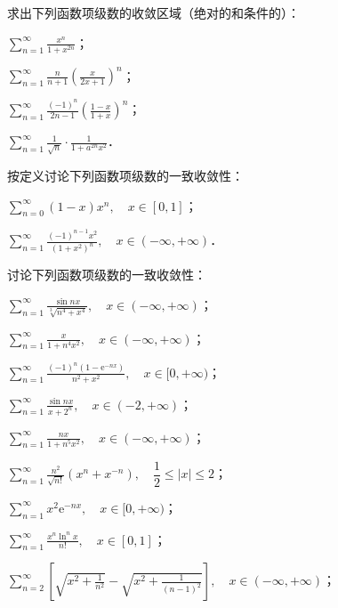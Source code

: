 \begin{xiti}
\item 求出下列函数项级数的收敛区域（绝对的和条件的）：
\begin{ziti}
\item $\displaystyle\sum_{n=1}^{\infty}\frac{x^{n}}{1+x^{2n}}$；
\item $\displaystyle\sum_{n=1}^{\infty}\frac{n}{n+1}\left(\frac{x}{2x+1}\right)^{n}$；
\item $\displaystyle\sum_{n=1}^{\infty}\frac{(-1)^{n}}{2n-1}\left(\frac{1-x}{1+x}\right)^{n}$；
\item $\displaystyle\sum_{n=1}^{\infty}\frac{1}{\sqrt{n}}\cdot\frac{1}{1+a^{2n}x^{2}}$．
\end{ziti}
\item 按定义讨论下列函数项级数的一致收敛性：
\begin{ziti}
\item $\displaystyle\sum_{n=0}^{\infty}(1-x)x^{n},\quad x\in[0,1]$；
\item $\displaystyle\sum_{n=1}^{\infty}\frac{(-1)^{n-1}x^{2}}{\left(1+x^{2}\right)^{n}},\quad x\in(-\infty,+\infty)$．
\end{ziti}
\item 讨论下列函数项级数的一致收敛性：
\begin{ziti}
\item $\displaystyle\sum_{n=1}^{\infty}\frac{\sin nx}{\sqrt[3]{n^{4}+x^{4}}},\quad x\in(-\infty,+\infty)$；
\item $\displaystyle\sum_{n=1}^{\infty}\frac{x}{1+n^{4}x^{2}},\quad x\in(-\infty,+\infty)$；
\item $\displaystyle\sum_{n=1}^{\infty}\frac{(-1)^{n}(1-\mathrm{e}^{-nx})}{n^{2}+x^{2}},\quad x\in[0,+\infty)$；
\item $\displaystyle\sum_{n=1}^{\infty}\frac{\sin nx}{x+2^{n}},\quad x\in(-2,+\infty)$；
\item $\displaystyle\sum_{n=1}^{\infty}\frac{nx}{1+n^{5}x^{2}},\quad x\in(-\infty,+\infty)$；
\item $\displaystyle\sum_{n=1}^{\infty}\frac{n^{2}}{\sqrt{n!}}\left(x^{n}+x^{-n}\right),\quad\dfrac{1}{2}\leqslant\left|x\right|\leqslant 2$；
\item $\displaystyle\sum_{n=1}^{\infty}x^{2}\mathrm{e}^{-nx},\quad x\in[0,+\infty)$；
\item $\displaystyle\sum_{n=1}^{\infty}\frac{x^{n}\ln^{n}x}{n!},\quad x\in[0,1]$；
\item $\displaystyle\sum_{n=2}^{\infty}\left[\sqrt{x^{2}+\frac{1}{n^{2}}}-\sqrt{x^{2}+\frac{1}{(n-1)^{2}}}\right],\quad x\in(-\infty,+\infty)$；

\end{ziti}
\end{xiti}

